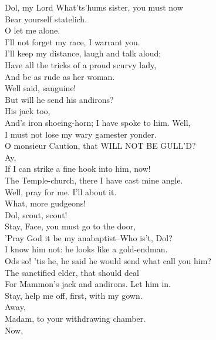 \documentclass{memoir}
\begin{document}
\begin{drama*}
\subtlespeaks  Dol, my Lord What'ts'hums sister, you must now\\
 Bear yourself statelich.\\
\dolspeaks {} O let me alone.\\
 I'll not forget my race, I warrant you.\\
 I'll keep my distance, laugh and talk aloud;\\
 Have all the tricks of a proud scurvy lady,\\
 And be as rude as her woman.\\
\facespeaks {} Well said, sanguine!\\
\subtlespeaks  But will he send his andirons?\\
\facespeaks {} His jack too,\\
 And's iron shoeing-horn; I have spoke to him. Well,\\
 I must not lose my wary gamester yonder.\\
\subtlespeaks  O monsieur Caution, that WILL NOT BE GULL'D?\\
\facespeaks  Ay,\\
 If I can strike a fine hook into him, now!\\
 The Temple-church, there I have cast mine angle.\\
 Well, pray for me. I'll about it.\\
\subtlespeaks {} What, more gudgeons!\\
 Dol, scout, scout!\\
 Stay, Face, you must go to the door,\\
 'Pray God it be my anabaptist--Who is't, Dol?\\
\dolspeaks  I know him not: he looks like a gold-endman.\\
\subtlespeaks  Ods so! 'tis he, he said he would send what call you him?\\
 The sanctified elder, that should deal\\
 For Mammon's jack and andirons. Let him in.\\
 Stay, help me off, first, with my gown.\\
 Away,\\
 Madam, to your withdrawing chamber.\\
 Now,\\

\end{drama*}
\end{document}
